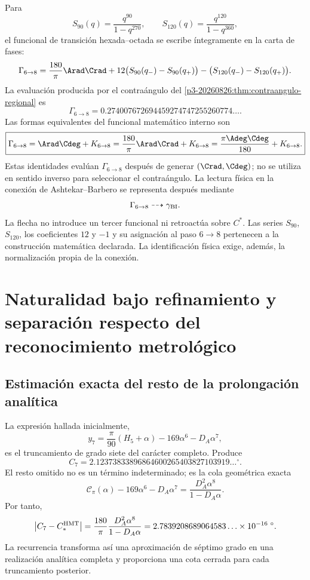 Para
\[
S_{90}(q)=\frac{q^{90}}{1-q^{270}},
\qquad
S_{120}(q)=\frac{q^{120}}{1-q^{360}},
\]
el funcional de transición hexada--octada se escribe íntegramente en la
carta de fases:
\[
\Gamma_{6\to8}
=\frac{180}{\pi}\Arad\Crad
+12\bigl(S_{90}(q_-)-S_{90}(q_+)\bigr)
-\bigl(S_{120}(q_-)-S_{120}(q_+)\bigr).
\]
La evaluación producida por el contraángulo del
\cref{p3-20260826:thm:contraangulo-regional} es
\[
\boxed{
\Gamma_{6\to8}
=0.274007672694459274747255260774\ldots.}
\]
Las formas equivalentes del funcional matemático interno son
\[
\boxed{
\Gamma_{6\to8}
=\Arad\Cdeg+K_{6\to8}
=\frac{180}{\pi}\Arad\Crad+K_{6\to8}
=\frac{\pi\Adeg\Cdeg}{180}+K_{6\to8}.}
\]
Estas identidades evalúan \(\Gamma_{6\to8}\) después de generar
\((\Crad,\Cdeg)\); no se utiliza en sentido inverso para seleccionar el
contraángulo. La lectura física en la conexión de Ashtekar--Barbero se
representa después mediante
\[
 \Gamma_{6\to8}\dashrightarrow\gamma_{\rm BI}.
\]
La flecha no introduce un tercer funcional ni retroactúa sobre \(C^*\). Las
series \(S_{90}\), \(S_{120}\), los coeficientes \(12\) y \(-1\) y su
asignación al paso \(6\to8\) pertenecen a la construcción matemática
declarada. La identificación física exige, además, la normalización propia
de la conexión.

\section{Naturalidad bajo refinamiento y separación respecto del reconocimiento metrológico}
\label{sec:s102:c38:7}

\subsection{Estimación exacta del resto de la prolongación analítica}
\label{sec:s102:c38:7:1}


La expresión hallada inicialmente,
\[
y_7=\frac\pi{90}(H_5+\alpha)-169\alpha^6-D_A\alpha^7,
\]
es el truncamiento de grado siete del carácter completo. Produce
\[
C_7=2.12373833896864600265403827103919\ldots{}^\circ.
\]
El resto omitido no es un término indeterminado; es la cola geométrica
exacta
\[
\mathscr C_\pi(\alpha)
-169\alpha^6-D_A\alpha^7
=\frac{D_A^2\alpha^8}{1-D_A\alpha}.
\]
Por tanto,
\[
\left|C_7-C_*^{\rm HMT}\right|
=\frac{180}{\pi}\frac{D_A^2\alpha^8}{1-D_A\alpha}
=2.7839208689064583\ldots\times10^{-16}\;{}^\circ.
\]
La recurrencia transforma así una aproximación de séptimo grado en una
realización analítica completa y proporciona una cota cerrada para cada
truncamiento posterior.

